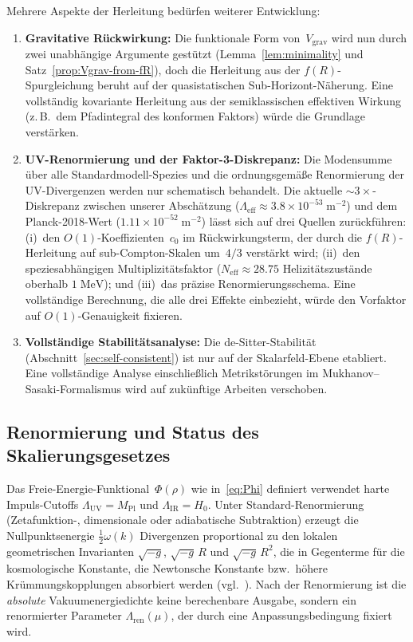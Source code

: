 \documentclass[12pt,a4paper]{article}
\theoremstyle{definition}
\theoremstyle{plain}
\theoremstyle{remark}
\newcommand{\Leff}{\Lambda_{\mathrm{eff}}}
\newcommand{\LUV}{\Lambda_{\mathrm{UV}}}
\newcommand{\LIR}{\Lambda_{\mathrm{IR}}}
\begin{document}
Mehrere Aspekte der Herleitung bed\"urfen weiterer Entwicklung:
\begin{enumerate}
  \item \textbf{Gravitative R\"uckwirkung:} Die funktionale Form
        von~$V_{\mathrm{grav}}$ wird nun durch zwei unabh\"angige
        Argumente gest\"utzt (Lemma~\ref{lem:minimality} und
        Satz~\ref{prop:Vgrav-from-fR}), doch die Herleitung aus
        der $f(R)$-Spurgleichung beruht auf der quasistatischen
        Sub-Horizont-N\"aherung. Eine vollst\"andig kovariante
        Herleitung aus der semiklassischen effektiven Wirkung
        (z.\,B.\ dem Pfadintegral des konformen Faktors) w\"urde die
        Grundlage verst\"arken.
  \item \textbf{UV-Renormierung und der Faktor-3-Diskrepanz:}
        Die Modensumme \"uber alle Standardmodell-Spezies und die
        ordnungsgem\"a\ss e Renormierung der UV-Divergenzen werden nur
        schematisch behandelt. Die aktuelle $\sim\!3\times$-Diskrepanz
        zwischen unserer Absch\"atzung
        ($\Leff \approx 3.8 \times 10^{-53}\;\mathrm{m}^{-2}$) und
        dem Planck-2018-Wert ($1.11 \times 10^{-52}\;\mathrm{m}^{-2}$)
        l\"asst sich auf drei Quellen zur\"uckf\"uhren:
        (i)~den $O(1)$-Koeffizienten~$c_0$ im R\"uckwirkungsterm,
        der durch die $f(R)$-Herleitung auf sub-Compton-Skalen um~$4/3$
        verst\"arkt wird; (ii)~den speziesabh\"angigen
        Multiplizit\"atsfaktor ($N_{\mathrm{eff}} \approx 28.75$
        Helizit\"atszust\"ande oberhalb $1\;\mathrm{MeV}$); und
        (iii)~das pr\"azise Renormierungsschema.  Eine vollst\"andige
        Berechnung, die alle drei Effekte einbezieht, w\"urde den
        Vorfaktor auf $O(1)$-Genauigkeit fixieren.
  \item \textbf{Vollst\"andige Stabilit\"atsanalyse:} Die
        de-Sitter-Stabilit\"at
        (Abschnitt~\ref{sec:self-consistent}) ist nur auf der
        Skalarfeld-Ebene etabliert. Eine vollst\"andige Analyse
        einschlie\ss lich Metrikst\"orungen im
        Mukhanov--Sasaki-Formalismus wird auf zuk\"unftige Arbeiten
        verschoben.
\end{enumerate}

\subsection{Renormierung und Status des Skalierungsgesetzes}
\label{sec:renorm}

Das Freie-Energie-Funktional~$\Phi(\rho)$ wie in~\eqref{eq:Phi}
definiert verwendet harte Impuls-Cutoffs $\LUV = M_{\mathrm{Pl}}$
und $\LIR = H_0$. Unter Standard-Renormierung
(Zetafunktion-, dimensionale oder adiabatische Subtraktion) erzeugt
die Nullpunktsenergie $\tfrac{1}{2}\omega(k)$ Divergenzen proportional
zu den lokalen geometrischen Invarianten $\sqrt{-g}$,
$\sqrt{-g}\,R$ und $\sqrt{-g}\,R^2$, die in Gegenterme f\"ur die
kosmologische Konstante, die Newtonsche Konstante bzw.\ h\"ohere
Kr\"ummungskopplungen absorbiert werden (vgl.~\cite{BirrellDavies1982}).
Nach der Renormierung ist die \emph{absolute} Vakuumenergiedichte keine
berechenbare Ausgabe, sondern ein renormierter Parameter
$\Lambda_{\mathrm{ren}}(\mu)$, der durch eine Anpassungsbedingung
fixiert wird.
\end{document}
